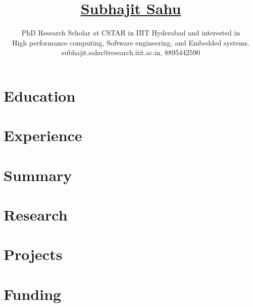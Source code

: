 \documentclass[11pt]{article}
\title{
  \vspace{-6ex}
  \href{https://orcid.org/0000-0001-5140-6578}{Subhajit Sahu}
  \vspace{-4ex}
}
\author{
  PhD Research Scholar at CSTAR in IIIT Hyderabad and interested in \\
  High performance computing, Software engineering, and Embedded systems. \\
  {\small subhajit.sahu@research.iiit.ac.in, 8895442590} \\
}
\date{}
\begin{document}
\maketitle
\vspace{-9ex}

\section{Education}


\section{Experience}


\section{Summary}


\section{Research}


\section{Projects}


\section{Funding}

\end{document}
